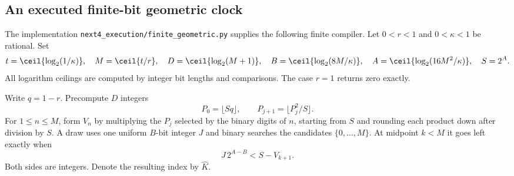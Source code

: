 \subsection{An executed finite-bit geometric clock}
The implementation \texttt{next4\_execution/finite\_geometric.py} supplies
the following finite compiler. Let $0<r<1$ and $0<\kappa<1$ be rational.
Set
\[
t=\ceil{\log_2(1/\kappa)},\quad M=\ceil{t/r},\quad
D=\ceil{\log_2(M+1)},\quad
B=\ceil{\log_2(8M/\kappa)},\quad
A=\ceil{\log_2(16M^2/\kappa)},\quad S=2^A .
\]
All logarithm ceilings are computed by integer bit lengths and comparisons.
The case $r=1$ returns zero exactly.

Write $q=1-r$. Precompute $D$ integers
\[
P_0=\lfloor Sq\rfloor,\qquad
P_{j+1}=\lfloor P_j^2/S\rfloor .
\]
For $1\le n\le M$, form $V_n$ by multiplying the $P_j$ selected by the
binary digits of $n$, starting from $S$ and rounding each product down
after division by $S$. A draw uses one uniform $B$-bit integer $J$ and
binary searches the candidates $\{0,\ldots,M\}$. At midpoint $k<M$ it
goes left exactly when
\[
J\,2^{A-B}<S-V_{k+1}.
\]
Both sides are integers. Denote the resulting index by $\widehat K$.

